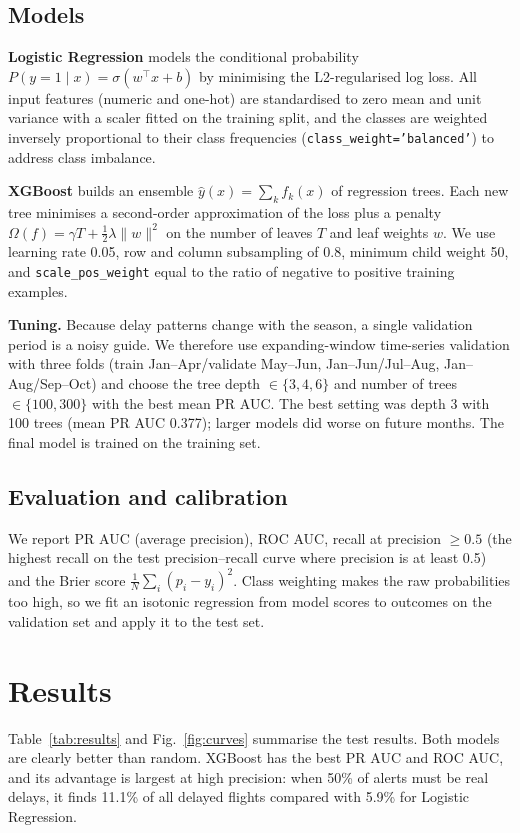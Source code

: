 \documentclass[conference]{IEEEtran}
\begin{document}
\subsection{Models}
\textbf{Logistic Regression} models the conditional probability $P(y=1\mid x)=\sigma(w^\top x+b)$ by minimising the L2-regularised log loss.
All input features (numeric and one-hot) are standardised to zero mean and unit variance with a scaler fitted on the training split, and the classes are weighted inversely proportional to their class frequencies (\texttt{class\_weight='balanced'}) to address class imbalance.


\textbf{XGBoost} builds an ensemble $\hat y(x)=\sum_k f_k(x)$ of regression trees. Each
new tree minimises a second-order approximation of the loss plus a penalty
$\Omega(f)=\gamma T+\frac{1}{2}\lambda\lVert w\rVert^2$ on the number of leaves $T$ and leaf weights $w$. We use
learning rate 0.05, row and column subsampling of 0.8, minimum child weight 50, and
\texttt{scale\_pos\_weight} equal to the ratio of negative to positive training examples.

\textbf{Tuning.} Because delay patterns change with the season, a single validation period is a noisy guide. We
therefore use expanding-window time-series validation with three folds (train Jan--Apr/validate May--Jun,
Jan--Jun/Jul--Aug, Jan--Aug/Sep--Oct) and choose the tree depth $\in\{3,4,6\}$ and number of trees
$\in\{100,300\}$ with the best mean PR AUC. The best setting was depth 3 with 100 trees (mean PR AUC 0.377); larger models did worse
on future months. The final model is trained on the training set.

\subsection{Evaluation and calibration}
We report PR AUC (average precision), ROC AUC, recall at precision $\ge 0.5$ (the highest recall on the test
precision--recall curve where precision is at least 0.5) and the Brier score
$\frac{1}{N}\sum_i (p_i-y_i)^2$. Class weighting makes the raw probabilities too high, so we fit an isotonic
regression from model scores to outcomes on the validation set and apply it to the test set.

\section{Results}
Table~\ref{tab:results} and Fig.~\ref{fig:curves} summarise the test results. Both models are clearly better than
random. XGBoost has the best PR AUC and ROC AUC, and its advantage is largest at high precision: when 50\% of
alerts must be real delays, it finds 11.1\% of all delayed flights compared with 5.9\% for Logistic Regression.
\end{document}
